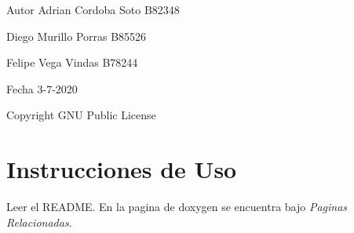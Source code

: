\begin{DoxyAuthor}{Autor}
Adrian Cordoba Soto B82348 

Diego Murillo Porras B85526 

Felipe Vega Vindas B78244 
\end{DoxyAuthor}
\begin{DoxyDate}{Fecha}
3-\/7-\/2020
\end{DoxyDate}
\begin{DoxyCopyright}{Copyright}
G\+NU Public License
\end{DoxyCopyright}
\hypertarget{index_intro}{}\section{Instrucciones de Uso}\label{index_intro}
Leer el R\+E\+A\+D\+ME. En la pagina de doxygen se encuentra bajo {\itshape Paginas Relacionadas}. 